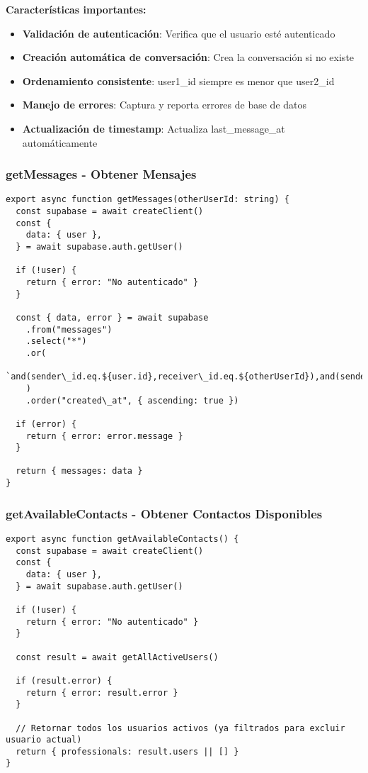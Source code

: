 \documentclass[12pt,a4paper]{article}
\begin{document}
\textbf{Características importantes:}
\begin{itemize}
    \item \textbf{Validación de autenticación}: Verifica que el usuario esté autenticado
    \item \textbf{Creación automática de conversación}: Crea la conversación si no existe
    \item \textbf{Ordenamiento consistente}: user1\_id siempre es menor que user2\_id
    \item \textbf{Manejo de errores}: Captura y reporta errores de base de datos
    \item \textbf{Actualización de timestamp}: Actualiza last\_message\_at automáticamente
\end{itemize}

\subsubsection{getMessages - Obtener Mensajes}

\begin{lstlisting}[caption=Función getMessages completa]
export async function getMessages(otherUserId: string) {
  const supabase = await createClient()
  const {
    data: { user },
  } = await supabase.auth.getUser()

  if (!user) {
    return { error: "No autenticado" }
  }

  const { data, error } = await supabase
    .from("messages")
    .select("*")
    .or(
      `and(sender\_id.eq.${user.id},receiver\_id.eq.${otherUserId}),and(sender\_id.eq.${otherUserId},receiver\_id.eq.${user.id})`,
    )
    .order("created\_at", { ascending: true })

  if (error) {
    return { error: error.message }
  }

  return { messages: data }
}
\end{lstlisting}

\subsubsection{getAvailableContacts - Obtener Contactos Disponibles}

\begin{lstlisting}[caption=Función getAvailableContacts completa]
export async function getAvailableContacts() {
  const supabase = await createClient()
  const {
    data: { user },
  } = await supabase.auth.getUser()

  if (!user) {
    return { error: "No autenticado" }
  }

  const result = await getAllActiveUsers()

  if (result.error) {
    return { error: result.error }
  }

  // Retornar todos los usuarios activos (ya filtrados para excluir usuario actual)
  return { professionals: result.users || [] }
}
\end{lstlisting}
\end{document}
